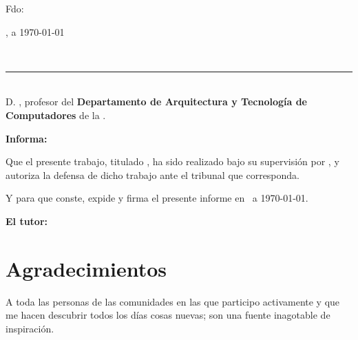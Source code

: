 \vspace{4cm}

\noindent Fdo: \autor

\vspace{2cm}

\begin{flushright}
\ciudad, a \today
\end{flushright}

\newpage
\thispagestyle{empty}
\
\vspace{3cm}

\noindent\rule[-1ex]{\textwidth}{2pt}\\[4.5ex]

D. \textbf{\tutor}, profesor del \textbf{Departamento de Arquitectura y Tecnología de Computadores} de la \textbf{\universidad}.

\vspace{0.5cm}

\vspace{0.5cm}

\textbf{Informa:}

\vspace{0.5cm}

Que el presente trabajo, titulado \textit{\textbf{\titulo}}, ha sido realizado bajo su supervisión por \textbf{\autor}, y 
autoriza la defensa de dicho trabajo ante el tribunal que corresponda.

\vspace{0.5cm}

Y para que conste, expide y firma el presente informe en \ciudad\ a \today.

\vspace{1cm}

\textbf{El tutor:}

\vspace{5cm}

\noindent \textbf{\tutor}

\chapter*{Agradecimientos}
\thispagestyle{empty}

\vspace{1cm}

A toda las personas de las comunidades en las que participo activamente y que me hacen descubrir todos los días cosas nuevas; son una fuente inagotable de inspiración.